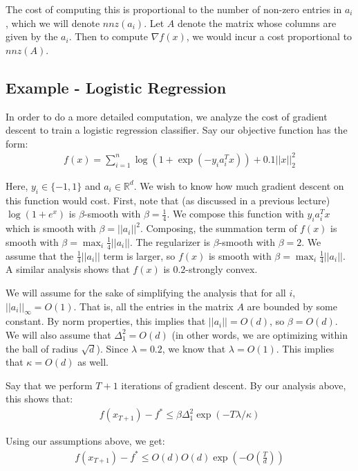 \documentclass[12pt]{report}
\def\real{\mathbb R}
\begin{document}
The cost of computing this is proportional to the number of non-zero entries in $a_i$, which we will denote $nnz(a_i)$. Let $A$ denote the matrix whose columns are given by the $a_i$. Then to compute $\nabla f(x)$, we would incur a cost proportional to $nnz(A)$.

\subsection{Example - Logistic Regression}

In order to do a more detailed computation, we analyze the cost of gradient descent to train a logistic regression classifier. Say our objective function has the form:
\begin{align*}
f(x) = \sum_{i=1}^n \log(1+\exp(-y_ia_i^Tx)) + 0.1||x||_2^2\end{align*}

Here, $y_i \in \{-1,1\}$ and $a_i \in \real^d$. We wish to know how much gradient descent on this function would cost. First, note that (as discussed in a previous lecture) $\log(1+e^x)$ is $\beta$-smooth with $\beta = \frac{1}{4}$. We compose this function with $y_ia_i^Tx$ which is smooth with $\beta = ||a_i||^2$. Composing, the summation term of $f(x)$ is smooth with $\beta = \max_i \frac{1}{4}||a_i||$. The regularizer is $\beta$-smooth with $\beta = 2$. We assume that the $\frac{1}{4}||a_i||$ term is larger, so $f(x)$ is smooth with $\beta = \max_i \frac{1}{4}||a_i||$. A similar analysis shows that $f(x)$ is $0.2$-strongly convex.

\medskip

We will assume for the sake of simplifying the analysis that for all $i$, $||a_i||_\infty = O(1)$. That is, all the entries in the matrix $A$ are bounded by some constant. By norm properties, this implies that $||a_i|| = O(d)$, so $\beta = O(d)$. We will also assume that $\Delta_1^2 = O(d)$ (in other words, we are optimizing within the ball of radius $\sqrt{d}$). Since $\lambda = 0.2$, we know that $\lambda = O(1)$. This implies that $\kappa = O(d)$ as well.

\medskip

Say that we perform $T+1$ iterations of gradient descent. By our analysis above, this shows that:
\begin{align*}
f(x_{T+1}) - f^* \leq \beta\Delta_1^2\exp(-T\lambda/\kappa)\end{align*}

Using our assumptions above, we get:
\begin{align*}
f(x_{T+1})-f^* \leq O(d)O(d)\exp(-O(\frac{T}{d}))\end{align*}
\end{document}
